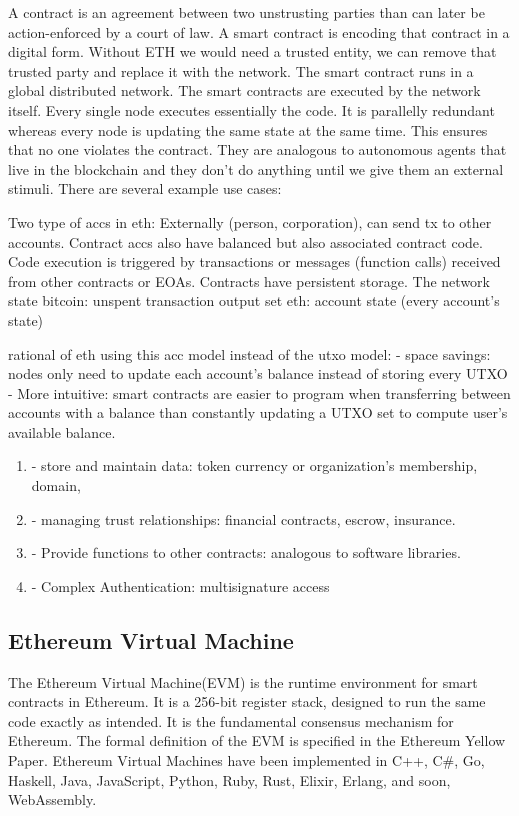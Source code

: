 \documentclass{article}
\begin{document}
A contract is an agreement between two unstrusting parties than can later be action-enforced by a court of law. A smart contract is encoding that contract in a digital form. Without ETH we would need a trusted entity, we can remove that trusted party and replace it with the network. The smart contract runs in a global distributed network. The smart contracts are executed by the network itself. Every single node executes essentially the code. It is parallelly redundant whereas every node is updating the same state at the same time. This ensures that no one violates the contract. They are analogous to autonomous agents that live in the blockchain and they don't do anything until we give them an external stimuli. There are several example use cases:



Two type of accs in eth: Externally (person, corporation), can send tx to other accounts. Contract accs also have balanced but also associated contract code. Code execution is triggered by transactions or messages (function calls) received from other contracts or EOAs. Contracts have persistent storage.
The network state 
bitcoin: unspent transaction output set
eth: account state (every account's state)

rational of eth using this acc model instead of the utxo model:
- space savings: nodes only need to update each account's balance instead of storing every UTXO
- More intuitive: smart contracts are easier to program when transferring between accounts with a balance than constantly updating a UTXO set to compute user's available balance.



\begin{enumerate}
\item - store and maintain data: token currency or organization's membership, domain,
\item - managing trust relationships: financial contracts, escrow, insurance.
\item - Provide functions to other contracts: analogous to software libraries.
\item - Complex Authentication: multisignature access
\end{enumerate}

\subsection{Ethereum Virtual Machine}

The Ethereum Virtual Machine(EVM) is the runtime environment for smart contracts in Ethereum. It is a 256-bit register stack, designed to run the same code exactly as intended. It is the fundamental consensus mechanism for Ethereum. The formal definition of the EVM is specified in the Ethereum Yellow Paper. Ethereum Virtual Machines have been implemented in C++, C#, Go, Haskell, Java, JavaScript, Python, Ruby, Rust, Elixir, Erlang, and soon, WebAssembly. \newline
\end{document}
